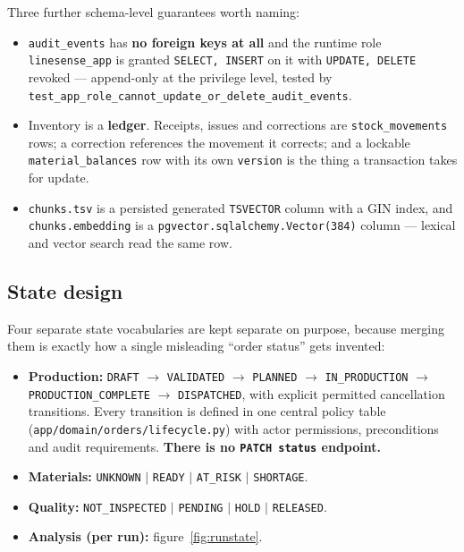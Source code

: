 \documentclass[11pt,a4paper]{article}
\begin{document}
Three further schema-level guarantees worth naming:

\begin{itemize}
\item \texttt{audit\_events} has \textbf{no foreign keys at all} and the runtime
  role \texttt{linesense\_app} is granted \texttt{SELECT, INSERT} on it with
  \texttt{UPDATE, DELETE} revoked --- append-only at the privilege level, tested
  by \texttt{test\_app\_role\_cannot\_update\_or\_delete\_audit\_events}.
\item Inventory is a \textbf{ledger}. Receipts, issues and corrections are
  \texttt{stock\_movements} rows; a correction references the movement it
  corrects; and a lockable \texttt{material\_balances} row with its own
  \texttt{version} is the thing a transaction takes for update.
\item \texttt{chunks.tsv} is a persisted generated \texttt{TSVECTOR} column with
  a GIN index, and \texttt{chunks.embedding} is a
  \texttt{pgvector.sqlalchemy.Vector(384)} column --- lexical and vector search
  read the same row.
\end{itemize}

\subsection{State design}

Four separate state vocabularies are kept separate on purpose, because merging
them is exactly how a single misleading ``order status'' gets invented:

\begin{itemize}
\item \textbf{Production:} \texttt{DRAFT} $\rightarrow$ \texttt{VALIDATED}
  $\rightarrow$ \texttt{PLANNED} $\rightarrow$ \texttt{IN\_PRODUCTION}
  $\rightarrow$ \texttt{PRODUCTION\_COMPLETE} $\rightarrow$ \texttt{DISPATCHED},
  with explicit permitted cancellation transitions. Every transition is defined
  in one central policy table (\texttt{app/domain/orders/lifecycle.py}) with
  actor permissions, preconditions and audit requirements. \textbf{There is no
  \texttt{PATCH status} endpoint.}
\item \textbf{Materials:} \texttt{UNKNOWN} $|$ \texttt{READY} $|$
  \texttt{AT\_RISK} $|$ \texttt{SHORTAGE}.
\item \textbf{Quality:} \texttt{NOT\_INSPECTED} $|$ \texttt{PENDING} $|$
  \texttt{HOLD} $|$ \texttt{RELEASED}.
\item \textbf{Analysis (per run):} figure~\ref{fig:runstate}.
\end{itemize}
\end{document}
